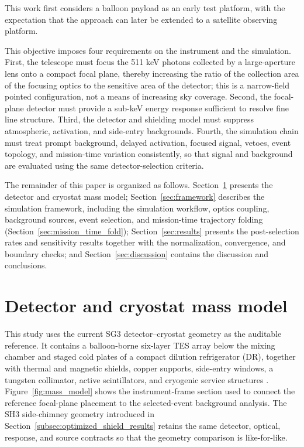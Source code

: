 \documentclass[11pt]{article}
\begin{document}
This work first considers a balloon payload as an early test platform, with the
expectation that the approach can later be extended to a satellite observing
platform.

This objective imposes four requirements on the instrument and the simulation.
First, the telescope must focus the 511 keV photons collected by a large-aperture
lens onto a compact focal plane, thereby increasing the ratio of the collection
area of the focusing optics to the sensitive area of the detector; this is a
narrow-field pointed configuration, not a means of increasing sky coverage.
Second, the focal-plane detector must provide a sub-keV energy response
sufficient to resolve fine line structure. Third, the detector and shielding
model must suppress atmospheric, activation, and side-entry backgrounds.
Fourth, the simulation chain must treat prompt background, delayed activation,
focused signal, vetoes, event topology, and mission-time variation consistently,
so that signal and background are evaluated using the same detector-selection
criteria.

The remainder of this paper is organized as follows. Section~\ref{sec:geometry}
presents the detector and cryostat mass model; Section~\ref{sec:framework}
describes the simulation framework, including the simulation workflow, optics
coupling, background sources, event selection, and mission-time trajectory
folding (Section~\ref{sec:mission_time_fold}); Section~\ref{sec:results} presents
the post-selection rates and sensitivity results together with the
normalization, convergence, and boundary checks; and
Section~\ref{sec:discussion} contains the discussion and conclusions.

\endgroup

\section{Detector and cryostat mass model}
\label{sec:geometry}

This study uses the current SG3 detector--cryostat geometry as the
auditable reference. It contains a balloon-borne six-layer TES array below the
mixing chamber and staged cold plates of a compact dilution refrigerator (DR),
together with thermal and magnetic shields, copper supports, side-entry windows,
a tungsten collimator, active scintillators, and cryogenic service structures
\cite{Shirazi2023,Gottardi2021TESReview}. Figure~\ref{fig:mass_model} shows the
instrument-frame section used to connect the reference focal-plane placement to
the selected-event background analysis. The SH3 side-chimney geometry introduced
in Section~\ref{subsec:optimized_shield_results} retains the same detector,
optical, response, and source contracts so that the geometry comparison is
like-for-like.
\end{document}
